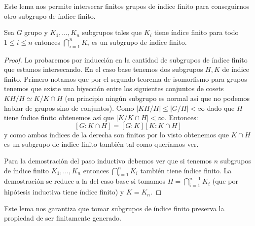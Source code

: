 \documentclass[tesis.tex]{subfiles}
\begin{document}
Este lema nos permite intersecar finitos grupos de índice finito para conseguirnos otro subgrupo de índice finito. 


\begin{lema}\label{lema_indice_interseccion}
	Sea $G$ grupo y $K_1, \dots, K_n$ subgrupos tales que $K_{i}$ tiene índice finito para todo $ 1 \le i \le n $ entonces $\bigcap_{i=1}^{n} K_{i}$ es un subgrupo de índice finito.
\end{lema}
\begin{proof}
	Lo probaremos por inducción en la cantidad de subgrupos de índice finito que estamos intersecando.
	En el caso base tenemos dos subgrupos $H,K$ de índice finito.
	Primero notamos que por el segundo teorema de isomorfismo para grupos tenemos que existe una biyección entre los siguientes conjuntos de cosets $ KH / H \simeq K / K \cap H $ (en principio ningún subgrupo es normal así que no podemos hablar de grupos sino de conjuntos).
	Como  $|KH / H| \le |G / H| < \infty$ dado que $H$ tiene índice finito obtenemos así que $|K / K \cap H| < \infty$.
	Entonces:
	\[
	[G:K\cap H] = [G:K][K: K \cap H]
	\]
	y como ambos índices de la derecha son finitos por lo visto obtenemos que $K \cap H$ es un subgrupo de índice finito también tal como queríamos ver.
	
	Para la demostración del paso inductivo debemos ver que si tenemos $n$ subgrupos de índice finito $K_{1}, \dots, K_{n}$ entonces $\bigcap_{i=1}^{n} K_{i}$ también tiene índice finito.
	La demostración se reduce a la del caso base si tomamos $H = \bigcap_{i=1}^{n-1} K_{i}$ (que por hipótesis inductiva tiene índice finito) y $K = K_{n}$.
\end{proof}

Este lema nos garantiza que tomar subgrupos de índice finito preserva la propiedad de ser finitamente generado.
\end{document}
